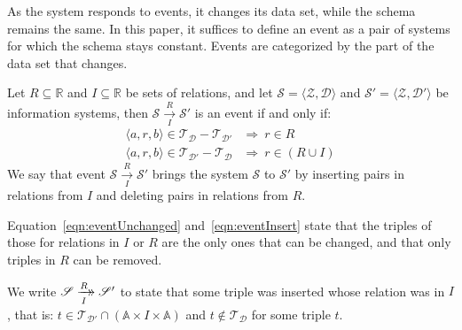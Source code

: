 \documentclass[runningheads]{llncs}
\newcommand{\xrightarrowdbl}[2][]{%
  \xrightarrow[#1]{#2}\mathrel{\mkern-14mu}\rightarrow
}
\newcommand{\pair}[2]{\langle{#1},{#2}\rangle}
\newcommand{\triple}[3]{\langle{#1},{#2},{#3}\rangle}
\newcommand{\Atoms}{\mathbb{A}}
\newcommand{\Rels}{\mathbb{R}}   %
\newcommand{\triples}{\mathcal{T}}
\newcommand{\Triple}[3]{#1\times#2\times#3}
\newcommand{\dataset}{\mathscr{D}}
\newcommand{\schema}{\mathscr{Z}}
\newcommand{\infsys}{\mathscr{S}}
\begin{document}
   As the system responds to events, it changes its data set, while the schema remains the same.
   In this paper, it suffices to define an event as a pair of systems for which the schema stays constant.
   Events are categorized by the part of the data set that changes.
   
\begin{definition}[Event]
   Let $R \subseteq \Rels$ and $I \subseteq \Rels$ be sets of relations,
   and let $\infsys=\pair{\schema}{\dataset}$ and  $\infsys'=\pair{\schema}{\dataset'}$ be information systems,
   then $\infsys\xrightarrow[I]{R} \infsys'$ is an event if and only if:
   \begin{align}
      \triple{a}{r}{b}\in\triples_{\dataset}-\triples_{\dataset'}&\Rightarrow\ r\in R
   \label{eqn:eventUnchanged}\\
      \triple{a}{r}{b}\in\triples_{\dataset'}-\triples_{\dataset}&\Rightarrow\ r\in(R \cup I)
   \label{eqn:eventInsert}
   \end{align}
   We say that event $\infsys\xrightarrow[I]{R} \infsys'$ brings the system $\infsys$ to $\infsys'$ by inserting pairs in relations from $I$ and deleting pairs in relations from $R$.
\end{definition}
   
   Equation~\ref{eqn:eventUnchanged} and~\ref{eqn:eventInsert} state that the triples of those for relations in $I$ or $R$ are the only ones that can be changed, and that only triples in $R$ can be removed.
   
\begin{definition}
   We write $\infsys \xrightarrowdbl[I]{R} \infsys'$ to state that some triple was inserted whose relation was in $I$, that is:
   $t \in \triples_{\dataset'} \cap (\Triple{\Atoms}{I}{\Atoms})$ and $t \not\in \triples_{\dataset}$ for some triple $t$.
\end{definition}
   
\end{document}
